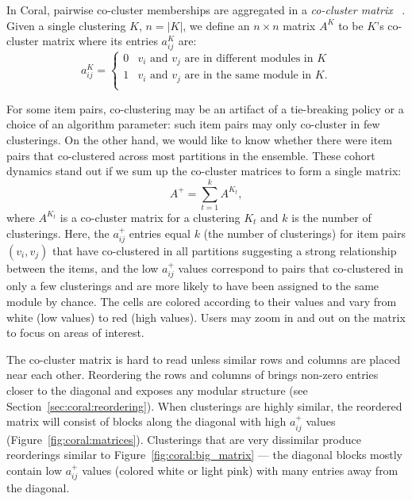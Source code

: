\documentclass[12pt]{cmuthesis}
\newcommand\Coral{Coral\xspace}
\begin{document}

  In \Coral, pairwise co-cluster memberships are aggregated in a \textit{co-cluster matrix}
  ~\cite{Monti2003a}. Given a single clustering $K$, $n = |K|$, we define an
  $n \times n$ matrix $A^{K}$ to be $K$'s co-cluster matrix where its entries
  $a_{ij}^{K}$ are:
  \[
   a_{ij}^{K} =
    \begin{cases}
  0 & \text{$v_{i}$ and $v_{j}$ are in different modules in $K$}\\
  1 & \text{$v_{i}$ and $v_{j}$ are in the same module in $K$}.\\
    \end{cases}
  \]

  For some item pairs, co-clustering may be an artifact of a tie-breaking policy or a choice of an algorithm parameter: such item pairs may only co-cluster in few clusterings. On the other hand, we would like to know whether there were item pairs that co-clustered across most partitions in the ensemble. These cohort dynamics stand out if we sum up the co-cluster matrices to form a single matrix:
  \[
   A^{+} = \sum_{t=1}^{k} A^{K_{t}},
  \]
  where $A^{K_{t}}$ is a co-cluster matrix for a clustering $K_{t}$ and $k$ is the
  number of clusterings. Here, the $a_{ij}^{+}$ entries equal $k$ (the number of
  clusterings) for item pairs $(v_{i}, v_{j})$ that have co-clustered in all
  partitions suggesting a strong relationship between the items, and the low
  $a_{ij}^{+}$ values correspond to pairs that co-clustered in only a few
  clusterings and are more likely to have been assigned to the same module by
  chance. The cells are colored according to their values and vary from white
  (low values) to red (high values). Users may zoom in and out on the matrix to
  focus on areas of interest.


  The co-cluster matrix is hard to read unless similar rows and columns are placed near each other. Reordering the rows and columns of \Mplus brings non-zero entries closer to the diagonal and exposes any modular structure (see Section~\ref{sec:coral:reordering}). When clusterings are highly similar, the reordered matrix will consist of blocks along the diagonal with high $a_{ij}^{+}$ values (Figure~\ref{fig:coral:matrices}). Clusterings that are very dissimilar produce reorderings similar to Figure~\ref{fig:coral:big_matrix} --- the diagonal blocks mostly contain low $a_{ij}^{+}$ values (colored white or light pink) with many entries away from the diagonal.
\end{document}
